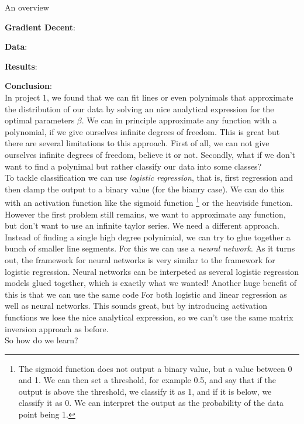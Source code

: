 \documentclass[twoside,11pt]{report}
\begin{document}
An overview

\textbf{Gradient Decent}: 

\textbf{Data}: 

\textbf{Results}:

\textbf{Conclusion}:\\

In project 1\cite{MachineLearningProjects_2023}, we found that 
we can fit lines or even polynimals that approximate the distribution of our data by solving an nice analytical expression for the optimal parameters $\beta$. We can in principle approximate 
any function with a polynomial, if we give ourselves infinite degrees of freedom. This is great but there are several
limitations to this approach. First of all, we can not give ourselves infinite degrees of freedom, believe it or not.
Secondly, what if we don't want to find a polynimal but rather classify our data into some classes?\\

\noindent
To tackle classification we can use \emph{logistic regression}, that is, first regression and then clamp the output to a binary value
(for the bianry case). We can do this with an activation function like the sigmoid function
\footnote{The sigmoid function does not output a binary value, but a value between 0 and 1. 
    We can then set a threshold, for example 0.5, and say that if the output is above the threshold, 
    we classify it as 1, and if it is below, we classify it as 0. We can interpret the output as the 
probability of the data point being 1.}
or the heaviside function. However the first problem
still remains, we want to approximate any function, but don't want to use an infinite taylor series. 
We need a different approach.
Instead of finding a single high degree polynimial, we can try to glue together a bunch of smaller line segments.
For this we can use a \emph{neural network}.
As it turns out, the framework for neural networks is very similar to the framework for logistic regression.
Neural networks can be interpeted as several logistic regression models glued together, which is exactly what we wanted!
Another huge benefit of this is that we can use the same code
For both logistic and linear regression as well as neural networks.
This sounds great, but by introducing activation functions we lose the nice analytical expression,
so we can't use the same matrix inversion approach as before.\\
So how do we learn?
\end{document}
